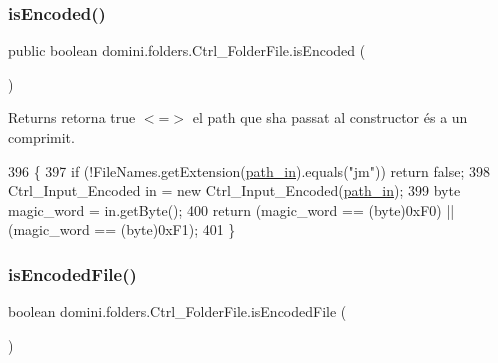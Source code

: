 \subsubsection{\texorpdfstring{is\+Encoded()}{isEncoded()}}
{\footnotesize\ttfamily public boolean domini.\+folders.\+Ctrl\+\_\+\+Folder\+File.\+is\+Encoded (\begin{DoxyParamCaption}{ }\end{DoxyParamCaption})\hspace{0.3cm}{\ttfamily [inline]}}

\begin{DoxyReturn}{Returns}
retorna true $<$=$>$ el path que s\textquotesingle{}ha passat al constructor és a un comprimit. 
\end{DoxyReturn}

\begin{DoxyCode}
396                                \{
397         \textcolor{keywordflow}{if} (!FileNames.getExtension(\hyperlink{classdomini_1_1folders_1_1Ctrl__FolderFile_a0d3946bb2832a1f34d0c2227df5c71c4}{path\_in}).equals(\textcolor{stringliteral}{"jm"})) \textcolor{keywordflow}{return} \textcolor{keyword}{false};
398         Ctrl\_Input\_Encoded in = \textcolor{keyword}{new} Ctrl\_Input\_Encoded(\hyperlink{classdomini_1_1folders_1_1Ctrl__FolderFile_a0d3946bb2832a1f34d0c2227df5c71c4}{path\_in});
399         byte magic\_word = in.getByte();
400         \textcolor{keywordflow}{return} (magic\_word == (byte)0xF0) || (magic\_word == (byte)0xF1);
401     \}
\end{DoxyCode}
\mbox{\label{classdomini_1_1folders_1_1Ctrl__FolderFile_a3198690e1ecc46e00431f35d87080d79}} 
\subsubsection{\texorpdfstring{is\+Encoded\+File()}{isEncodedFile()}}
{\footnotesize\ttfamily boolean domini.\+folders.\+Ctrl\+\_\+\+Folder\+File.\+is\+Encoded\+File (\begin{DoxyParamCaption}{ }\end{DoxyParamCaption})\hspace{0.3cm}{\ttfamily [inline]}}



